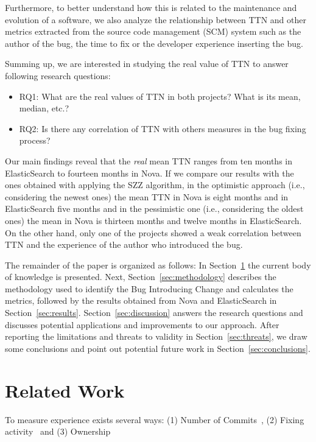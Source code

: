 \documentclass[10pt, conference]{IEEEtran}
\begin{document}
Furthermore, to better understand how this is related to the maintenance and evolution of a software, we also analyze the relationship between TTN and other metrics extracted from the source code management (SCM) system such as the author of the bug, the time to fix or the developer experience inserting the bug.

Summing up, we are interested in studying the real value of TTN to answer following research questions:

\begin{itemize}
\item RQ1: What are the real values of TTN in both projects? What is its mean, median, etc.?
\item RQ2: Is there any correlation of TTN with others measures in the bug fixing process?
\end{itemize}

Our main findings reveal that the \emph{real} mean TTN ranges from ten months in ElasticSearch to fourteen months in Nova. If we compare our results with the ones obtained with applying the SZZ algorithm, in the optimistic approach (i.e., considering the newest ones) the mean TTN in Nova is eight months and in ElasticSearch five months and in the pessimistic one (i.e., considering the oldest ones) the mean in Nova is thirteen months and twelve months in ElasticSearch. On the other hand, only one of the projects showed a weak correlation between TTN and the experience of the author who introduced the bug.

The remainder of the paper is organized as follows: In Section~\ref{sec:relatedwork} the current body of knowledge is presented. Next, Section~\ref{sec:methodology} describes the methodology used to identify the Bug Introducing Change and calculates the metrics, followed by the results obtained from Nova and ElasticSearch in Section~\ref{sec:results}. Section~\ref{sec:discussion} answers the research questions and discusses potential applications and improvements to our approach. After reporting the limitations and threats to validity in Section~\ref{sec:threats}, we draw some conclusions and point out potential future work in Section~\ref{sec:conclusions}.

\section{Related Work}
\label{sec:relatedwork}

To measure experience exists several ways: (1) Number of Commits~\cite{eyolfson2011time}, (2) Fixing activity~\cite{ahsan2010mining} and (3) Ownership~\cite{german2004using}
\end{document}
